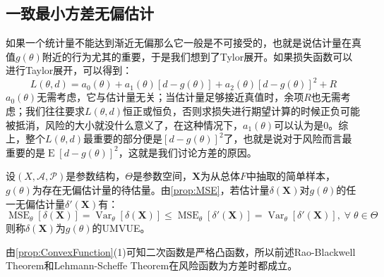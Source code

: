 \subsection{一致最小方差无偏估计}
\begin{note}
	如果一个统计量不能达到渐近无偏那么它一般是不可接受的，也就是说估计量在真值$g(\theta)$附近的行为尤其的重要，于是我们想到了Tylor展开。如果损失函数可以进行Taylor展开，可以得到：
	\begin{equation*}
		L(\theta,d)=a_0(\theta)+a_1(\theta)[d-g(\theta)]+a_2(\theta)[d-g(\theta)]^2+R
	\end{equation*}
	$a_0(\theta)$无需考虑，它与估计量无关；当估计量足够接近真值时，余项$R$也无需考虑；我们往往要求$L(\theta,d)$恒正或恒负，否则求损失进行期望计算的时候正负可能被抵消，风险的大小就没什么意义了，在这种情况下，$a_1(\theta)$可以认为是$0$。综上，整个$L(\theta,d)$最重要的部分便是$[d-g(\theta)]^2$了，也就是说对于风险而言最重要的是$\operatorname{E}[d-g(\theta)]^2$，这就是我们讨论方差的原因。
\end{note}
\begin{definition}
	设$(X,\mathscr{A},\mathscr{P})$是参数结构，$\Theta$是参数空间，$\mathbf{X}$为从总体$F$中抽取的简单样本，$g(\theta)$为存在无偏估计量的待估量。由\cref{prop:MSE}，若估计量$\delta(\mathbf{X})$对$g(\theta)$的任一无偏估计量$\delta'(\mathbf{X})$有：
	\begin{equation*}
		\operatorname{MSE}_{\theta}[\delta(\mathbf{X})]=\operatorname{Var}_{\theta}[\delta(\mathbf{X})]\leqslant\operatorname{MSE}_{\theta}[\delta'(\mathbf{X})]=\operatorname{Var}_{\theta}[\delta'(\mathbf{X})],\;\forall\;\theta\in\Theta
	\end{equation*}
	则称$\delta(\mathbf{X})$为$g(\theta)$的\gls{UMVUE}。
\end{definition}
\begin{note}
	由\cref{prop:ConvexFunction}(1)可知二次函数是严格凸函数，所以前述Rao-Blackwell Theorem和Lehmann-Scheffe Theorem在风险函数为方差时都成立。
\end{note}
